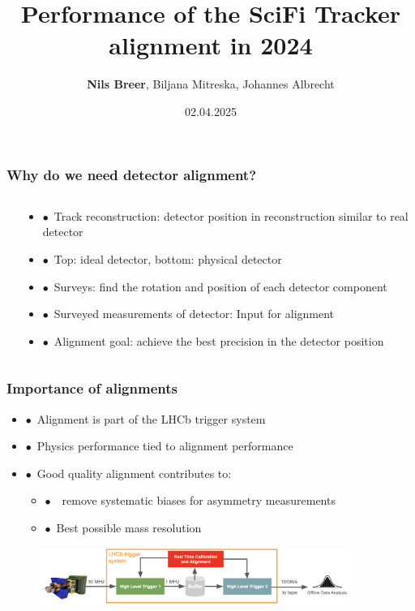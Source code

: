 \documentclass[aspectratio=1610, 12pt, xcolor=dvipsnames]{beamer}
\title{Performance of the SciFi Tracker alignment in 2024}
\author[N.Breer]{\textbf{Nils Breer}, Biljana Mitreska, Johannes Albrecht}
\institute{DPG Conference 2025, Göttingen}
\date{02.04.2025}
\begin{document}
\maketitle

\begin{frame}\frametitle{Why do we need detector alignment?}
  \begin{columns}
    \begin{column}[c]{0.5\textwidth}
      
    \end{column}
    \begin{column}[c]{0.5\textwidth}
      \begin{itemize}
        \item $\bullet$\, Track reconstruction: detector position in reconstruction similar to real detector
        \item $\bullet$\, Top: ideal detector, bottom: physical detector
        \item $\bullet$\, Surveys: find the rotation and position of each detector component
        \item $\bullet$\, Surveyed measurements of detector: Input for alignment
        \item $\bullet$\, Alignment goal: achieve the best precision in the detector position
      \end{itemize}
    \end{column}
  \end{columns}
\end{frame}

\begin{frame}\frametitle{Importance of alignments}
  \begin{itemize}
    \item $\bullet$\, Alignment is part of the LHCb trigger system
    \item $\bullet$\, Physics performance tied to alignment performance
    \item $\bullet$\, Good quality alignment contributes to:
    \begin{itemize}
      \item $\bullet$\, \to\, remove systematic biases for asymmetry measurements
      \item $\bullet$\, Best possible mass resolution
    \end{itemize}
  \end{itemize}
  \begin{figure}
      \includegraphics[width=0.9\textwidth]{logos/dataflow.png}%
  \end{figure}
\end{frame}
\end{document}
